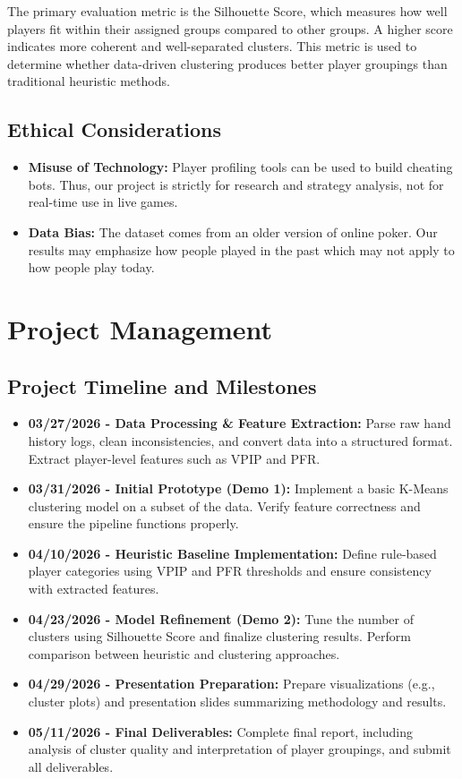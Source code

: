\documentclass[11pt]{extarticle}
\begin{document}
The primary evaluation metric is the Silhouette Score, which measures how well players fit within their assigned groups compared to other groups. A higher score indicates more coherent and well-separated clusters. This metric is used to determine whether data-driven clustering produces better player groupings than traditional heuristic methods.

\subsection{Ethical Considerations}
\begin{itemize}
    \item \textbf{Misuse of Technology:} Player profiling tools can be used to build cheating bots. Thus, our project is strictly for research and strategy analysis, not for real-time use in live games.
    \item \textbf{Data Bias:} The dataset comes from an older version of online poker. Our results may emphasize how people played in the past which may not apply to how people play today.
\end{itemize}

\section{Project Management}
\subsection{Project Timeline and Milestones}
\begin{itemize}
    \item \textbf{03/27/2026 - Data Processing \& Feature Extraction:} Parse raw hand history logs, clean inconsistencies, and convert data into a structured format. Extract player-level features such as VPIP and PFR.
    \item \textbf{03/31/2026 - Initial Prototype (Demo 1):} Implement a basic K-Means clustering model on a subset of the data. Verify feature correctness and ensure the pipeline functions properly.
    \item \textbf{04/10/2026 - Heuristic Baseline Implementation:} Define rule-based player categories using VPIP and PFR thresholds and ensure consistency with extracted features.
    \item \textbf{04/23/2026 - Model Refinement (Demo 2):} Tune the number of clusters using Silhouette Score and finalize clustering results. Perform comparison between heuristic and clustering approaches.
    \item \textbf{04/29/2026 - Presentation Preparation:} Prepare visualizations (e.g., cluster plots) and presentation slides summarizing methodology and results.
    \item \textbf{05/11/2026 - Final Deliverables:} Complete final report, including analysis of cluster quality and interpretation of player groupings, and submit all deliverables.
\end{itemize}
\end{document}
